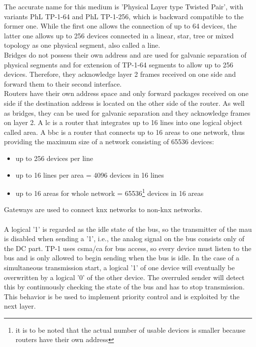 The accurate name for this medium is 'Physical Layer type Twisted Pair', with variants
PhL \gls{TP}-1-64 and PhL \gls{TP}-1-256, which is backward compatible to the former one. While the first one allows
the connection of up to 64 devices, the latter one allows up to 256 devices connected in a linear, star, tree or
mixed topology as one physical segment, also called a line.
\\
Bridges do not possess their own address and are used for galvanic separation of physical segments and for extension of TP-1-64 segments to allow up to 256 devices.
Therefore, they acknowledge layer 2 frames received on one side and forward them to their second interface. 
\\
Routers have their own address space and only forward packages received on one side if the destination address is located on the other side of the router.
As well as bridges, they can be used for galvanic separation and they acknowledge frames on layer 2.
A \gls{lc} is a router that integrates up to 16 lines into one logical object called area. A \gls{bbc} is a router that connects
up to 16 areas to one network, thus providing the maximum size of a network consisting of 65536 devices:
\begin{itemize}
 \item up to 256 devices per line
 \item up to 16 lines per area = 4096 devices in 16 lines
 \item up to 16 areas for whole network = 65536\footnote{it is to be noted that the actual number of usable devices is smaller because routers have
 their own address} devices in 16 areas
\end{itemize}
Gateways are used to connect \gls{knx} networks to non-\gls{knx} networks.
\\
\\
A logical '1' is regarded as the idle state of the bus, so the transmitter of the \gls{mau} is disabled when sending a '1', i.e., the analog signal on
the bus consists only of the DC part. \gls{TP}-1 uses \gls{csma}/\gls{ca} for bus access, so every device must listen to the bus and is only allowed
to begin sending when the bus is idle. In the case of a simultaneous transmission start, a logical '1' of one
device will eventually be overwritten by a logical '0' of the other device. The overruled
sender will detect this by continuously checking the state of the bus and has to stop 
transmission. This behavior is be used to implement priority control and is exploited by the next layer.

